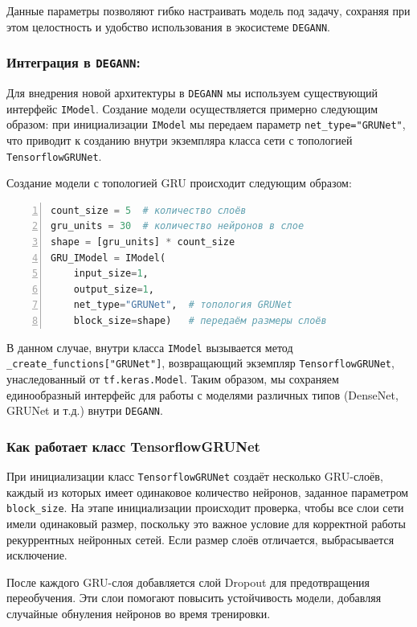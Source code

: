 Данные параметры позволяют гибко настраивать модель под задачу, сохраняя при этом целостность и удобство использования в экосистеме \texttt{DEGANN}.

\subsubsection{Интеграция в \texttt{DEGANN}:}
Для внедрения новой архитектуры в \texttt{DEGANN} мы используем существующий интерфейс \texttt{IModel}. Создание модели осуществляется примерно следующим образом: при инициализации \texttt{IModel} мы передаем параметр \texttt{net\_type="GRUNet"}, что приводит к созданию внутри экземпляра класса сети с топологией \texttt{TensorflowGRUNet}.

Создание модели с топологией GRU происходит следующим образом:

\begin{lstlisting}[language=Python, caption=Создание модели с использованием топологии GRUNet, numbers=left]
count_size = 5  # количество слоёв
gru_units = 30  # количество нейронов в слое
shape = [gru_units] * count_size
GRU_IModel = IModel(
    input_size=1,
    output_size=1,
    net_type="GRUNet",  # топология GRUNet
    block_size=shape)   # передаём размеры слоёв
\end{lstlisting}

В данном случае, внутри класса \texttt{IModel} вызывается метод \texttt{\_create\_functions["GRUNet"]}, возвращающий экземпляр \texttt{TensorflowGRUNet}, унаследованный от \texttt{tf.keras.Model}. Таким образом, мы сохраняем единообразный интерфейс для работы с моделями различных типов (DenseNet, GRUNet и т.д.) внутри \texttt{DEGANN}.

\subsubsection{Как работает класс TensorflowGRUNet}
При инициализации класс \texttt{TensorflowGRUNet} создаёт несколько GRU-слоёв, каждый из которых имеет одинаковое количество нейронов, заданное параметром \texttt{block\_size}. На этапе инициализации происходит проверка, чтобы все слои сети имели одинаковый размер, поскольку это важное условие для корректной работы рекуррентных нейронных сетей. Если размер слоёв отличается, выбрасывается исключение.

После каждого GRU-слоя добавляется слой Dropout для предотвращения переобучения. Эти слои помогают повысить устойчивость модели, добавляя случайные обнуления нейронов во время тренировки.


